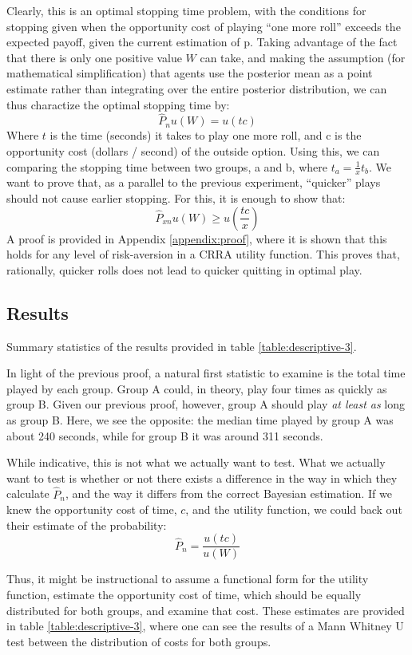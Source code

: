 \documentclass[a4paper,12pt]{article}
\begin{document}
Clearly, this is an optimal stopping time problem, with the conditions for stopping given when the opportunity cost of playing ``one more roll'' exceeds the expected payoff, given the current estimation of p. Taking advantage of the fact that there is only one positive value $W$ can take, and making the assumption (for mathematical simplification) that agents use the posterior mean as a point estimate rather than integrating over the entire posterior distribution, we can thus charactize the optimal stopping time by:
$$
\hat{P}_n u(W) = u(tc)
$$
Where $t$ is the time (seconds) it takes to play one more roll, and c is the opportunity cost (dollars / second) of the outside option. Using this, we can comparing the stopping time between two groups, a and b, where $t_a = \frac{1}{x}t_b$. We want to prove that, as a parallel to the previous experiment, ``quicker'' plays should not cause earlier stopping. For this, it is enough to show that:
$$
\hat{P}_{xn}u(W) \geq u \left( \frac{tc}{x} \right)
$$
A proof is provided in Appendix \ref{appendix:proof}, where it is shown that this holds for any level of risk-aversion in a CRRA utility function. This proves that, rationally, quicker rolls does not lead to quicker quitting in optimal play.

\subsection{ Results }

Summary statistics of the results provided in table \ref{table:descriptive-3}.

In light of the previous proof, a natural first statistic to examine is the total time played by each group. Group A could, in theory, play four times as quickly as group B. Given our previous proof, however, group A should play \textit{ at least as } long as group B. Here, we see the opposite: the median time played by group A was about 240 seconds, while for group B it was around 311 seconds.

While indicative, this is not what we actually want to test. What we actually want to test is whether or not there exists a difference in the way in which they calculate $\hat{P}_n$, and the way it differs from the correct Bayesian estimation. If we knew the opportunity cost of time, $c$, and the utility function, we could back out their estimate of the probability:
$$
\hat{P}_n = \frac{u(tc)}{u(W)}
$$

Thus, it might be instructional to assume a functional form for the utility function, estimate the opportunity cost of time, which should be equally distributed for both groups, and examine that cost. These estimates are provided in table \ref{table:descriptive-3}, where one can see the results of a Mann Whitney U test between the distribution of costs for both groups.
\end{document}
